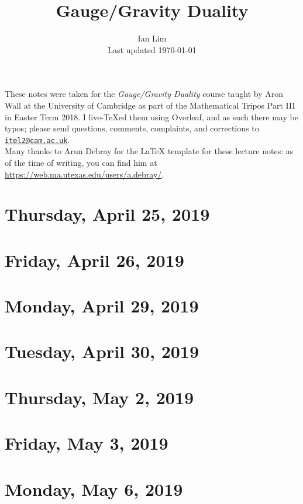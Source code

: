 \documentclass[reqno]{amsart}
\begin{document}
\title{Gauge/Gravity Duality}
\author{Ian Lim\\ Last updated \today}
\maketitle
{\small\noindent These notes were taken for the \textit{Gauge/Gravity Duality} course taught by Aron Wall at the University of Cambridge as part of the Mathematical Tripos Part III in Easter Term 2018. I live-\TeX ed them using Overleaf, and as such there may be typos; please send questions, comments, complaints, and corrections to 
\href{mailto:itel2@cam.ac.uk?subject=GGD\%20Lecture\%20Notes}{\texttt{itel2@cam.ac.uk}}.\\
Many thanks to Arun Debray for the {\LaTeX} template for these lecture notes: as of the time of writing, you can find him at \url{https://web.ma.utexas.edu/users/a.debray/}.}

\tableofcontents

\section{Thursday, April 25, 2019}
	
\section{Friday, April 26, 2019}
	

\section{Monday, April 29, 2019}
    
\section{Tuesday, April 30, 2019}
    
\section{Thursday, May 2, 2019}
    
\section{Friday, May 3, 2019}
    

\section{Monday, May 6, 2019}
    
\end{document}
